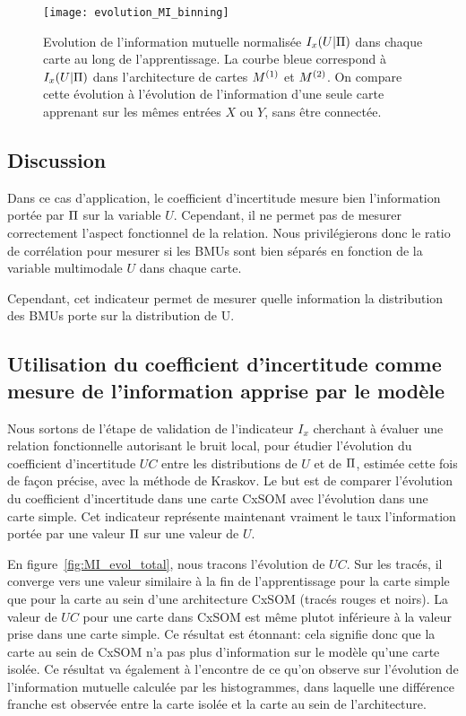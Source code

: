 \documentclass[../main]{subfiles}
\begin{document}
\begin{figure}
\texttt{[image: evolution\_MI\_binning]}
\caption{Evolution de l'information mutuelle normalisée $I_x(U|\Pi)$ dans chaque carte au long de l'apprentissage. La courbe bleue correspond à $I_x(U|\Pi)$ dans l'architecture de cartes $M^{({1})}$ et $M^{({2})}$. On compare cette évolution à l'évolution de l'information d'une seule carte apprenant sur les mêmes entrées $X$ ou $Y$, sans être connectée.}
    \label{fig:MI_evol}
\end{figure}

\subsection{Discussion}

Dans ce cas d'application, le coefficient d'incertitude mesure bien l'information portée par $\Pi$ sur la variable $U$. Cependant, il ne permet pas de mesurer correctement l'aspect fonctionnel de la relation. Nous privilégierons donc le ratio de corrélation pour mesurer si les BMUs sont bien séparés en fonction de la variable multimodale $U$ dans chaque carte.

Cependant, cet indicateur permet de mesurer quelle information la distribution des BMUs porte sur la distribution de U. 

\subsection{Utilisation du coefficient d'incertitude comme mesure de l'information apprise par le modèle}

Nous sortons de l'étape de validation de l'indicateur $I_x$ cherchant à évaluer une relation fonctionnelle autorisant le bruit local, pour étudier l'évolution du coefficient d'incertitude $UC$ entre les distributions de $U$ et de $\Pi$, estimée cette fois de façon précise, avec la méthode de Kraskov.
Le but est de comparer l'évolution du coefficient d'incertitude dans une carte CxSOM avec l'évolution dans une carte simple. Cet indicateur représente maintenant vraiment le taux l'information portée par une valeur $\Pi$ sur une valeur de $U$.

En figure~\ref{fig:MI_evol_total}, nous tracons l'évolution de $UC$.
Sur les tracés, il converge vers une valeur similaire à la fin de l'apprentissage pour la carte simple que pour la carte au sein d'une architecture CxSOM (tracés rouges et noirs). La valeur de $UC$ pour une carte dans CxSOM est même plutot inférieure à la valeur prise dans une carte simple.
Ce résultat est étonnant: cela signifie donc que la carte au sein de CxSOM n'a pas plus d'information sur le modèle qu'une carte isolée. Ce résultat va également à l'encontre de ce qu'on observe sur l'évolution de l'information mutuelle calculée par les histogrammes, dans laquelle une différence franche est observée entre la carte isolée et la carte au sein de l'architecture.
\end{document}
